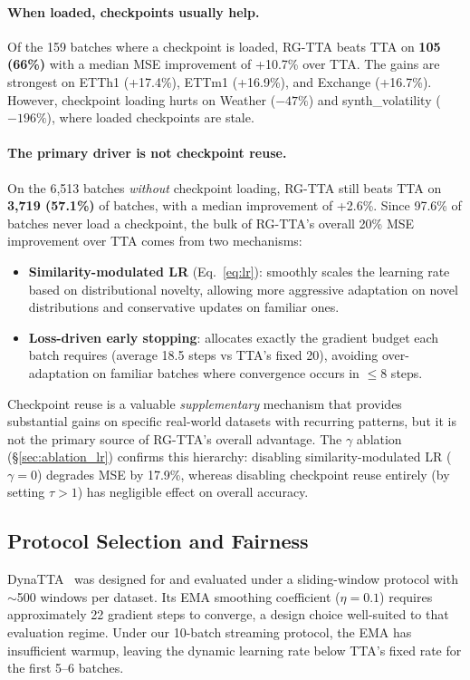 \documentclass[11pt,a4paper]{article}
\begin{document}
\paragraph{When loaded, checkpoints usually help.} Of the 159 batches where a checkpoint is loaded, RG-TTA beats TTA on \textbf{105 (66\%)} with a median MSE improvement of +10.7\% over TTA. The gains are strongest on ETTh1 (+17.4\%), ETTm1 (+16.9\%), and Exchange (+16.7\%). However, checkpoint loading hurts on Weather ($-47\%$) and synth\_volatility ($-196\%$), where loaded checkpoints are stale.

\paragraph{The primary driver is not checkpoint reuse.} On the 6{,}513 batches \emph{without} checkpoint loading, RG-TTA still beats TTA on \textbf{3{,}719 (57.1\%)} of batches, with a median improvement of +2.6\%. Since 97.6\% of batches never load a checkpoint, the bulk of RG-TTA's overall 20\% MSE improvement over TTA comes from two mechanisms:
\begin{itemize}[nosep]
  \item \textbf{Similarity-modulated LR} (Eq.~\ref{eq:lr}): smoothly scales the learning rate based on distributional novelty, allowing more aggressive adaptation on novel distributions and conservative updates on familiar ones.
  \item \textbf{Loss-driven early stopping}: allocates exactly the gradient budget each batch requires (average 18.5 steps vs TTA's fixed 20), avoiding over-adaptation on familiar batches where convergence occurs in $\leq$8 steps.
\end{itemize}
Checkpoint reuse is a valuable \emph{supplementary} mechanism that provides substantial gains on specific real-world datasets with recurring patterns, but it is not the primary source of RG-TTA's overall advantage. The $\gamma$ ablation (\S\ref{sec:ablation_lr}) confirms this hierarchy: disabling similarity-modulated LR ($\gamma{=}0$) degrades MSE by 17.9\%, whereas disabling checkpoint reuse entirely (by setting $\tau > 1$) has negligible effect on overall accuracy.

\subsection{Protocol Selection and Fairness}
\label{sec:fairness}

DynaTTA~\citep{grover2025dynatta} was designed for and evaluated under a sliding-window protocol with $\sim$500 windows per dataset. Its EMA smoothing coefficient ($\eta = 0.1$) requires approximately 22 gradient steps to converge, a design choice well-suited to that evaluation regime. Under our 10-batch streaming protocol, the EMA has insufficient warmup, leaving the dynamic learning rate below TTA's fixed rate for the first 5--6 batches.
\end{document}
